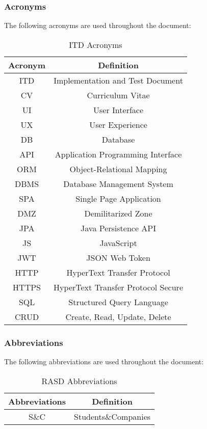 \subsubsection{Acronyms}
The following acronyms are used throughout the document:
\begin{table}[H]
    \centering
    \begin{tabular}{|c|c|}
        \hline
        \textbf{Acronym} & \textbf{Definition} \\ \hline
        ITD       & Implementation and Test Document  \\ \hline
        CV         & Curriculum Vitae \\ \hline
        UI         & User Interface \\ \hline
        UX         & User Experience \\ \hline
        DB         & Database \\ \hline
        API        & Application Programming Interface \\ \hline
        ORM        & Object-Relational Mapping \\ \hline
        DBMS       & Database Management System \\ \hline
        SPA        & Single Page Application \\ \hline
        DMZ        & Demilitarized Zone \\ \hline
        JPA        & Java Persistence API \\ \hline
        JS         & JavaScript \\ \hline
        JWT        & JSON Web Token \\ \hline
        HTTP       & HyperText Transfer Protocol \\ \hline
        HTTPS      & HyperText Transfer Protocol Secure \\ \hline
        SQL        & Structured Query Language \\ \hline
        CRUD       & Create, Read, Update, Delete \\ \hline
    \end{tabular}
    \caption{ITD Acronyms}
    \label{tab:ITDacronyms}
\end{table}

\subsubsection{Abbreviations}
The following abbreviations are used throughout the document:
\begin{table}[H]
    \centering
\begin{tabular}{|c|c|}
        \hline
        \textbf{Abbreviations} & \textbf{Definition} \\ \hline
        S\&C & Students\&Companies \\ \hline
    \end{tabular}
    \caption{RASD Abbreviations}
    \label{tab:abbreviations}
\end{table}
